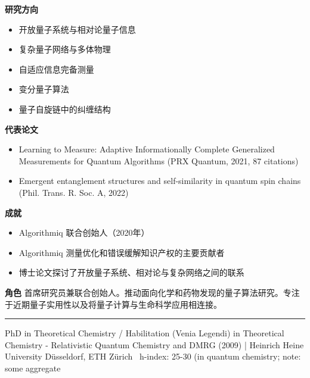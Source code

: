 \par{\footnotesize\color{mainred}\textbf{研究方向}}
\begin{itemize}[leftmargin=1.2em,itemsep=0pt,topsep=0pt]
\item {\footnotesize 开放量子系统与相对论量子信息}
\item {\footnotesize 复杂量子网络与多体物理}
\item {\footnotesize 自适应信息完备测量}
\item {\footnotesize 变分量子算法}
\item {\footnotesize 量子自旋链中的纠缠结构}
\end{itemize}
\par{\footnotesize\color{mainred}\textbf{代表论文}}
\begin{itemize}[leftmargin=1.2em,itemsep=0pt,topsep=0pt]
\item {\footnotesize Learning to Measure: Adaptive Informationally Complete Generalized Measurements for Quantum Algorithms (PRX Quantum, 2021, 87 citations)}
\item {\footnotesize Emergent entanglement structures and self-similarity in quantum spin chains (Phil. Trans. R. Soc. A, 2022)}
\end{itemize}
\par{\footnotesize\color{mainred}\textbf{成就}}
\begin{itemize}[leftmargin=1.2em,itemsep=0pt,topsep=0pt]
\item {\footnotesize Algorithmiq 联合创始人（2020年）}
\item {\footnotesize Algorithmiq 测量优化和错误缓解知识产权的主要贡献者}
\item {\footnotesize 博士论文探讨了开放量子系统、相对论与复杂网络之间的联系}
\end{itemize}
\par{\footnotesize\color{mainred}\textbf{角色}} {\footnotesize 首席研究员兼联合创始人。推动面向化学和药物发现的量子算法研究。专注于近期量子实用性以及将量子计算与生命科学应用相连接。}
\vspace{2pt}\hrule\vspace{2pt}
\vspace{4pt}
\par{\footnotesize\color{graytext}PhD in Theoretical Chemistry / Habilitation (Venia Legendi) in Theoretical Chemistry - Relativistic Quantum Chemistry and DMRG (2009) | Heinrich Heine University Düsseldorf, ETH Zürich \textbar\  h-index: 25-30 (in quantum chemistry; note: some aggregate }
